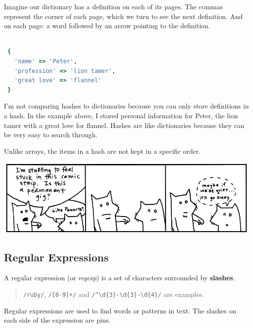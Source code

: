 \documentclass[10pt,twoside]{report}
\begin{document}
Imagine our dictionary has a definition on each of its pages.  The
commas represent the corner of each page, which we turn to see the
next definition.  And on each page: a word followed by an arrow
pointing to the definition.


\begin{lstlisting}[basicstyle=\ttfamily\color{basiccolor},
    commentstyle = \ttfamily\color{commentcolor},
    keywordstyle=\ttfamily\color{keywordscolor},
    stringstyle=\color{stringcolor},
    language=Ruby,
    basicstyle=\small\ttfamily,
    showstringspaces=false,
  ]

 {
   'name' => 'Peter',
   'profession' => 'lion tamer',
   'great love' => 'flannel'
 }

\end{lstlisting}


I'm not comparing hashes to dictionaries because you can only store
definitions in a hash.  In the example above, I stored personal
information for Peter, the lion tamer with a great love for flannel.
Hashes are like dictionaries because they can be very easy to search
through.

Unlike arrays, the items in a hash are not kept in a specific order.

	\includegraphics[width=1.0\textwidth]{cache/15.png}




\subsection{Regular Expressions}



A regular expression (or {\em regexp}) is a set of characters
surrounded by {\bf slashes}.

\begin{quote}
\lstinline[breaklines=true]|/ruby/|,
\lstinline[breaklines=true]|/[0-9]+/| and
\lstinline[breaklines=true]|/^\d{3}-\d{3}-\d{4}/| are
examples.\end{quote}


Regular expressions are used to find words or patterns in text.  The
slashes on each side of the expression are pins.
\end{document}
